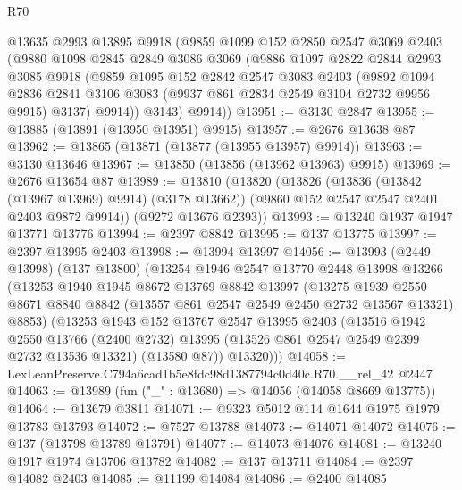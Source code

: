 \begin{lexlean}{R70}
\begin{coremodule}
      @13635
      @2993
      @13895
      @9918
      (@9859
        @1099
        @152
        @2850
        @2547
        @3069
        @2403
        (@9880
          @1098
          @2845
          @2849
          @3086
          @3069
          (@9886
            @1097
            @2822
            @2844
            @2993
            @3085
            @9918
            (@9859
              @1095
              @152
              @2842
              @2547
              @3083
              @2403
              (@9892
                @1094
                @2836
                @2841
                @3106
                @3083
                (@9937 @861 @2834 @2549 @3104 @2732 @9956 @9915)
                @3137)
              @9914))
          @3143)
        @9914))
@13951 := @3130 @2847
@13955 := @13885 (@13891 (@13950 @13951) @9915)
@13957 := @2676 @13638 @87
@13962 := @13865 (@13871 (@13877 (@13955 @13957) @9914))
@13963 := @3130 @13646
@13967 := @13850 (@13856 (@13962 @13963) @9915)
@13969 := @2676 @13654 @87
@13989 := @13810
    (@13820
      (@13826
        (@13836 (@13842 (@13967 @13969) @9914) (@3178 @13662))
        (@9860 @152 @2547 @2547 @2401 @2403 @9872 @9914))
      (@9272 @13676 @2393))
@13993 := @13240 @1937 @1947 @13771 @13776
@13994 := @2397 @8842
@13995 := @137 @13775
@13997 := @2397 @13995 @2403
@13998 := @13994 @13997
@14056 := @13993
    (@2449 @13998)
    (@137 @13800)
    (@13254
      @1946
      @2547
      @13770
      @2448
      @13998
      @13266
      (@13253
        @1940
        @1945
        @8672
        @13769
        @8842
        @13997
        (@13275
          @1939
          @2550
          @8671
          @8840
          @8842
          (@13557 @861 @2547 @2549 @2450 @2732 @13567 @13321)
          @8853)
        (@13253
          @1943
          @152
          @13767
          @2547
          @13995
          @2403
          (@13516
            @1942
            @2550
            @13766
            (@2400 @2732)
            @13995
            (@13526 @861 @2547 @2549 @2399 @2732 @13536 @13321)
            (@13580 @87))
          @13320)))
@14058 := LexLeanPreserve.C794a6cad1b5e8fdc98d1387794c0d40c.R70.__rel_42 @2447
@14063 := @13989 (fun ("_" : @13680) => @14056 (@14058 @8669 @13775))
@14064 := @13679 @3811
@14071 := @9323 @5012 @114 @1644 @1975 @1979 @13783 @13793
@14072 := @7527 @13788
@14073 := @14071 @14072
@14076 := @137 (@13798 @13789 @13791)
@14077 := @14073 @14076
@14081 := @13240 @1917 @1974 @13706 @13782
@14082 := @137 @13711
@14084 := @2397 @14082 @2403
@14085 := @11199 @14084
@14086 := @2400 @14085

\end{coremodule}
\end{lexlean}
